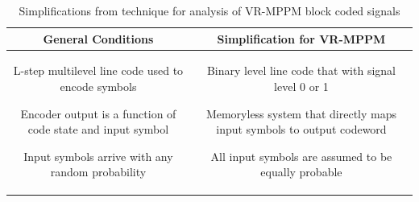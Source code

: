 \begin{table}[htbp]
\begin{center}
\caption[Assumptions for PSD analysis]{Simplifications from \cite{cariolaro1974spectra} technique for analysis of VR-MPPM block coded signals}
\begin{tabular}{|c|c|}
\hline\hline
General Conditions & Simplification for VR-MPPM\\
\hline\hline
\parbox{2.5in}{
\begin{list}{}{}
\item L-step multilevel line code used to encode symbols 
\item Encoder output is a function of code state and input symbol 
\item	Input symbols arrive with any random probability 
\end{list}
}
 & 
\parbox{2.5in}{
\begin{list}{}{}
\item Binary level line code that with signal level 0 or 1
\item Memoryless system that directly maps input symbols to output codeword
\item   All input symbols are assumed to be equally probable 
\end{list}
}\\
\hline
\end{tabular}

\label{tab:simplifications}
\end{center}
\end{table}

%	





